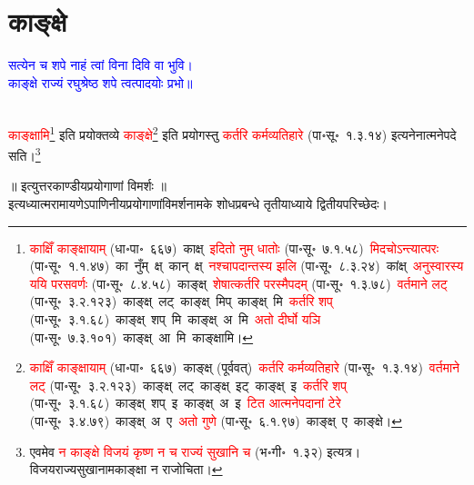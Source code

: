\section[काङ्क्षे]{काङ्क्षे}
\centering\textcolor{blue}{सत्येन च शपे नाहं त्वां विना दिवि वा भुवि।\nopagebreak\\
काङ्क्षे राज्यं रघुश्रेष्ठ शपे त्वत्पादयोः प्रभो॥}\nopagebreak\\
\\
\fontsize{14}{21}\selectfont\begin{sloppypar}\justifying\noindent\hspace{10mm} \textcolor{red}{काङ्क्षामि}\footnote{\textcolor{red}{काक्षिँ काङ्क्षायाम्} (धा॰पा॰~६६७)~\arrow काक्ष्~\arrow \textcolor{red}{इदितो नुम् धातोः} (पा॰सू॰~७.१.५८)~\arrow \textcolor{red}{मिदचोऽन्त्यात्परः} (पा॰सू॰~१.१.४७)~\arrow का~नुँम्~क्ष्~\arrow कान्~क्ष्~\arrow \textcolor{red}{नश्चापदान्तस्य झलि} (पा॰सू॰~८.३.२४)~\arrow कांक्ष्~\arrow \textcolor{red}{अनुस्वारस्य ययि परसवर्णः} (पा॰सू॰~८.४.५८)~\arrow काङ्क्ष्~\arrow \textcolor{red}{शेषात्कर्तरि परस्मैपदम्} (पा॰सू॰~१.३.७८)~\arrow \textcolor{red}{वर्तमाने लट्} (पा॰सू॰~३.२.१२३)~\arrow काङ्क्ष्~लट्~\arrow काङ्क्ष्~मिप्~\arrow काङ्क्ष्~मि~\arrow \textcolor{red}{कर्तरि शप्} (पा॰सू॰~३.१.६८)~\arrow काङ्क्ष्~शप्~मि~\arrow काङ्क्ष्~अ~मि~\arrow \textcolor{red}{अतो दीर्घो यञि} (पा॰सू॰~७.३.१०१)~\arrow काङ्क्ष्~आ~मि~\arrow काङ्क्षामि।} इति प्रयोक्तव्ये \textcolor{red}{काङ्क्षे}\footnote{\textcolor{red}{काक्षिँ काङ्क्षायाम्} (धा॰पा॰~६६७)~\arrow काङ्क्ष् (पूर्ववत्)~\arrow \textcolor{red}{कर्तरि कर्म\-व्यतिहारे} (पा॰सू॰~१.३.१४)~\arrow \textcolor{red}{वर्तमाने लट्} (पा॰सू॰~३.२.१२३)~\arrow काङ्क्ष्~लट्~\arrow काङ्क्ष्~इट्~\arrow काङ्क्ष्~इ~\arrow \textcolor{red}{कर्तरि शप्} (पा॰सू॰~३.१.६८)~\arrow काङ्क्ष्~शप्~इ~\arrow काङ्क्ष्~अ~इ~\arrow \textcolor{red}{टित आत्मनेपदानां टेरे} (पा॰सू॰~३.४.७९)~\arrow काङ्क्ष्~अ~ए~\arrow \textcolor{red}{अतो गुणे} (पा॰सू॰~६.१.९७)~\arrow काङ्क्ष्~ए~\arrow काङ्क्षे।} इति प्रयोगस्तु \textcolor{red}{कर्तरि कर्म\-व्यतिहारे} (पा॰सू॰~१.३.१४) इत्यनेनात्मनेपदे सति।\footnote{एवमेव \textcolor{red}{न काङ्क्षे विजयं कृष्ण न च राज्यं सुखानि च} (भ॰गी॰~१.३२) इत्यत्र। विजय\-राज्य\-सुखानामकाङ्क्षा न राजोचिता।}\end{sloppypar}
\vspace{2mm}
\centering ॥ इत्युत्तरकाण्डीयप्रयोगाणां विमर्शः ॥\nopagebreak\\
\vspace{4mm}
\centering इत्यध्यात्म\-रामायणेऽपाणिनीय\-प्रयोगाणां\-विमर्श\-नामके शोध\-प्रबन्धे तृतीयाध्याये द्वितीय\-परिच्छेदः।\nopagebreak\\
